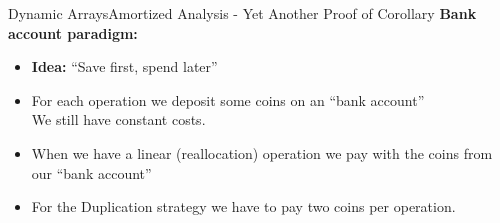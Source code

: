 

\begin{frame}{Dynamic Arrays}{Amortized Analysis -
    Yet Another Proof of Corollary}
  \textbf{Bank account paradigm:}
  \begin{itemize}
    \item
      \textbf{Idea:}
       \enquote{Save first, spend later} 
    \item
      For each operation we deposit some coins on an \enquote{bank account}\\
      We still have constant costs.
    \item
      When we have a linear (reallocation) operation we pay with the coins from our \enquote{bank account}
    \item
      For the Duplication strategy we have to pay
      two coins per operation.
  \end{itemize}
\end{frame}

